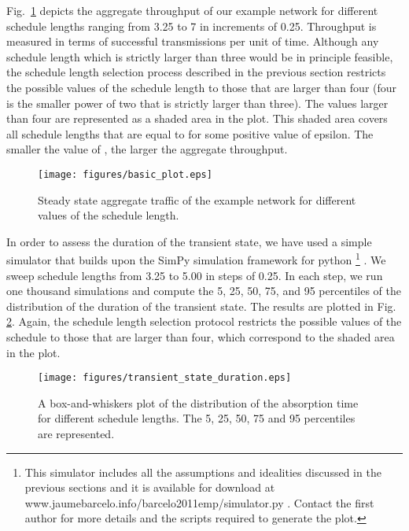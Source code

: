 \documentclass[twocolumn]{svjour3}          \smartqed  \usepackage{graphicx}
\begin{document}
Fig.~\ref{fig:basic_plot} depicts the aggregate throughput of our example network for different schedule lengths ranging from 3.25 to 7 in increments of 0.25.
Throughput is measured in terms of successful transmissions per unit of time.
Although any schedule length which is strictly larger than three would be in principle feasible, the schedule length selection process described in the previous section restricts the possible values of the schedule length to those that are larger than four (four is the smaller power of two that is strictly larger than three).
The values larger than four are represented as a shaded area in the plot.
This shaded area covers all schedule lengths that are equal to \mbox{} for some positive value of epsilon.
The smaller the value of , the larger the aggregate throughput.

\begin{figure}
\centering
  \texttt{[image: figures/basic\_plot.eps]}
\caption{Steady state aggregate traffic of the example network for different values of the schedule length.}
\label{fig:basic_plot}
\end{figure}

In order to assess the duration of the transient state, we have used a simple simulator that builds upon the SimPy \cite{mueller2004doc} simulation framework for python
\footnote{This simulator includes all the assumptions and idealities discussed in the previous sections and it is available for download at www.jaumebarcelo.info/barcelo2011emp/simulator.py . Contact the first author for more details and the scripts required to generate the plot.}
.
We sweep schedule lengths from 3.25 to 5.00 in steps of 0.25.
In each step, we run one thousand simulations and compute the 5, 25, 50, 75, and 95 percentiles of the distribution of the duration of the transient state.
The results are plotted in Fig. \ref{fig:transient_state_duration}.
Again, the schedule length selection protocol restricts the possible values of the schedule to those that are larger than four, which correspond to the shaded area in the plot.



\begin{figure}
\centering
  \texttt{[image: figures/transient\_state\_duration.eps]}
\caption{A box-and-whiskers plot of the distribution of the absorption time for different schedule lengths. The 5, 25, 50, 75 and 95 percentiles are represented.}
\label{fig:transient_state_duration}
\end{figure}
\end{document}
